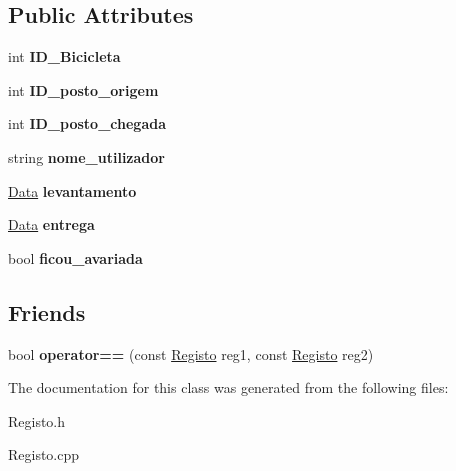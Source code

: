 \subsection*{Public Attributes}
\begin{DoxyCompactItemize}
\item 
\hypertarget{class_registo_af745f6be9e0f119ff8285f2ad7bc0007}{int {\bfseries I\+D\+\_\+\+Bicicleta}}\label{class_registo_af745f6be9e0f119ff8285f2ad7bc0007}

\item 
\hypertarget{class_registo_ab1eceed0788883d77f331da0eed92876}{int {\bfseries I\+D\+\_\+posto\+\_\+origem}}\label{class_registo_ab1eceed0788883d77f331da0eed92876}

\item 
\hypertarget{class_registo_a95a2f4c5bbad742f0ccdfc0da873a2c2}{int {\bfseries I\+D\+\_\+posto\+\_\+chegada}}\label{class_registo_a95a2f4c5bbad742f0ccdfc0da873a2c2}

\item 
\hypertarget{class_registo_a58143db2825d4cc53f502001fa5d7659}{string {\bfseries nome\+\_\+utilizador}}\label{class_registo_a58143db2825d4cc53f502001fa5d7659}

\item 
\hypertarget{class_registo_ac0d3e2faff6e42050b6f75a3db8ae92b}{\hyperlink{class_data}{Data} {\bfseries levantamento}}\label{class_registo_ac0d3e2faff6e42050b6f75a3db8ae92b}

\item 
\hypertarget{class_registo_a051ce058418ededccbe9aae6900cd817}{\hyperlink{class_data}{Data} {\bfseries entrega}}\label{class_registo_a051ce058418ededccbe9aae6900cd817}

\item 
\hypertarget{class_registo_afa35faa61b95b63bbab972cfaca38b98}{bool {\bfseries ficou\+\_\+avariada}}\label{class_registo_afa35faa61b95b63bbab972cfaca38b98}

\end{DoxyCompactItemize}
\subsection*{Friends}
\begin{DoxyCompactItemize}
\item 
\hypertarget{class_registo_aaf8e089b26abe6bc63d1c2399433bce6}{bool {\bfseries operator==} (const \hyperlink{class_registo}{Registo} reg1, const \hyperlink{class_registo}{Registo} reg2)}\label{class_registo_aaf8e089b26abe6bc63d1c2399433bce6}

\end{DoxyCompactItemize}


The documentation for this class was generated from the following files\+:\begin{DoxyCompactItemize}
\item 
Registo.\+h\item 
Registo.\+cpp\end{DoxyCompactItemize}
